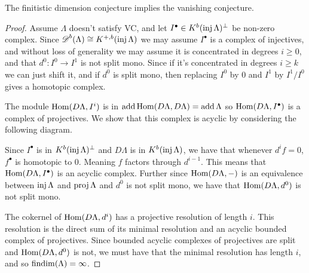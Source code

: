 \begin{theorem} \cite[1.2]{Hap93} \label{thm:FDC_implies_VC}
	The finitistic dimension conjecture implies the vanishing conjecture.
	\begin{proof}
		Assume $\Lambda$ doesn't satisfy VC, and let $I^\bullet \in K^b(\operatorname{inj}\Lambda)^\perp$ be non-zero complex. Since $\operatorname{\mathscr{D}}^b(\Lambda) \cong K^{+,b}(\operatorname{inj}\Lambda)$ we may assume $I^\bullet$ is a complex of injectives, and without loss of generality we may assume it is concentrated in degrees $i \geq 0$, and that $d^0\colon I^0 \to I^1$ is not split mono. Since if it's concentrated in degrees $i \geq k$ we can just shift it, and if $d^0$ is split mono, then replacing $I^0$ by $0$ and $I^1$ by $I^1/I^0$ gives a homotopic complex.
			
		The module $\operatorname{Hom}(D\Lambda, I^i)$ is in $\operatorname{add}\operatorname{Hom}(D\Lambda, D\Lambda) = \operatorname{add}\Lambda$ so $\operatorname{Hom}(D\Lambda, I^\bullet)$ is a complex of projectives. We show that this complex is acyclic by considering the following diagram.
		
		\begin{center}
		\end{center}
		
		Since $I^\bullet$ is in $K^b(\operatorname{inj}\Lambda)^\perp$ and $D\Lambda$ is in $K^b(\operatorname{inj}\Lambda)$, we have that whenever $d^if=0$, $f^\bullet$ is homotopic to 0. Meaning $f$ factors through $d^{i-1}$. This means that $\operatorname{Hom}(D\Lambda, I^\bullet)$ is an acyclic complex. Further since $\operatorname{Hom}(D\Lambda, -)$ is an equivalence between $\operatorname{inj}\Lambda$ and $\operatorname{proj}\Lambda$ and $d^0$ is not split mono, we have that $\operatorname{Hom}(D\Lambda, d^0)$ is not split mono.
		
		The cokernel of $\operatorname{Hom}(D\Lambda, d^i)$ has a projective resolution of length $i$. This resolution is the direct sum of its minimal resolution and an acyclic bounded complex of projectives. Since bounded acyclic complexes of projectives are split and $\operatorname{Hom}(D\Lambda, d^0)$ is not, we must have that the minimal resolution has length $i$, and so $\operatorname{findim}(\Lambda) = \infty$.
	\end{proof}
\end{theorem}

